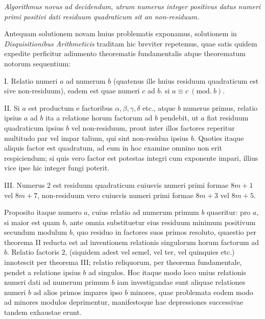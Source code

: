 \begin{center}\textit{Algorithmus novus ad decidendum, utrum numerus integer positivus datus numeri primi positivi dati residuum quadraticum sit an non-residuum.}\end{center}


Antequam solutionem novam huius problematis exponamus, solutionem in \textit{Disquisitionibus Arithmeticis} traditam hic breviter repetemus, quae satis quidem expedite perficitur adiumento theorematis fundamentalis atque theorematum notorum sequentium:

I. Relatio numeri $a$ ad numerum $b$ (quatenus ille huius residuum qua\-draticum est sive non-residuum), eadem est quae numeri $c$ ad $b$. si $a\equiv c\ (\mathrm{mod.}\ b)$.

II. Si $a$ est productum e factoribus $\alpha,\beta,\gamma,\delta$ etc., atque $b$ numerus primus, relatio ipsius $a$ ad $b$ ita a relatione horum factorum ad $b$ pendebit, ut $a$ fiat residuum quadraticum ipsius $b$ vel non-residuum, prout inter illos factores reperitur multitudo par vel impar talium, qui sint non-residua ipsius $b$. Quoties itaque aliquis factor est quadratum, ad eum in hoc examine omnino non erit respiciendum; si quis vero factor est potestas integri cum exponente impari, illius vice ipse hic integer fungi poterit.

III. Numerus 2 est residuum quadraticum cuiusvis numeri primi formae $8m+1$ vel $8m+7$, non-residuum vero cuiusvis numeri primi formae $8m+3$ vel $8m+5$.

%
Proposito itaque numero $a$, cuius relatio ad numerum primum $b$ quaeritur: pro $a$, si maior est quam $b$, ante omnia substituetur eius residuum minimum positivum secundum modulum $b$, quo residuo in factores suos primos resoluto, quaestio per theorema II reducta est ad inventionem relationis singulorum horum factorum ad $b$. Relatio factoris $2$, (siquidem adest vel semel, vel ter, vel quinquies etc.) innotescit per theorema III; relatio reliquorum, per theorema fundamentale, pendet a relatione ipsius $b$ ad singulos. Hoc itaque modo loco unius relationis numeri dati ad numerum primum $b$ iam investigandae sunt aliquae relationes numeri $b$ ad alios primos impares ipso $b$ minores, quae problemata eodem modo ad minores modulos deprimentur, manifestoque hae depressiones successivae tandem exhaustae erunt.

